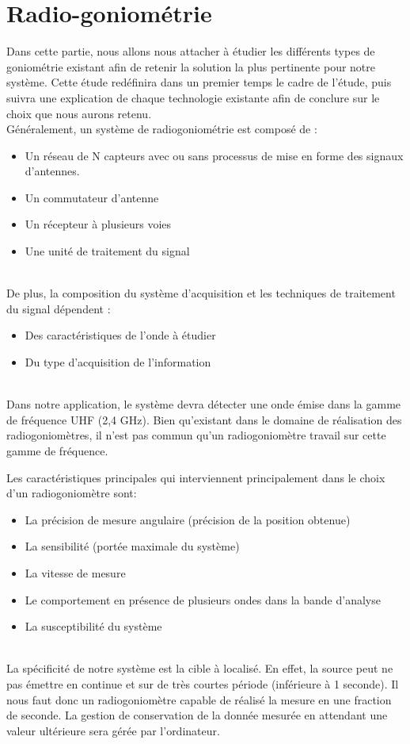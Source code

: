 \chapter{Radio-goniométrie}



Dans cette partie, nous allons nous attacher à étudier les différents types de goniométrie existant afin de retenir la solution la plus pertinente pour notre système. Cette étude redéfinira dans un premier temps le cadre de l’étude, puis suivra une explication de chaque technologie existante afin de conclure sur le choix que nous aurons retenu.
~\\

Généralement, un système de radiogoniométrie est composé de  :

\begin{itemize}
\item Un réseau de N capteurs avec ou sans processus de mise en forme des signaux d’antennes.

\item Un commutateur d’antenne
\item Un récepteur à plusieurs voies
\item Une unité de traitement du signal

\end{itemize}
~\\
De plus, la composition du système d’acquisition et les techniques de traitement du signal dépendent :
\begin{itemize}
\item  Des caractéristiques de l’onde à étudier
\item  Du type d’acquisition de l’information
\end{itemize}
~\\
Dans notre application, le système devra détecter une onde émise dans la gamme de fréquence UHF (2,4 GHz). Bien qu’existant dans le domaine de réalisation des radiogoniomètres, il n’est pas commun qu’un radiogoniomètre travail sur cette gamme de fréquence.

Les caractéristiques principales qui interviennent principalement dans le choix d’un radiogoniomètre sont:

\begin{itemize}
\item La précision de mesure angulaire (précision de la position obtenue)
\item La sensibilité (portée maximale du système) 
\item La vitesse de mesure
\item Le comportement en présence de plusieurs ondes dans la bande d’analyse
\item La susceptibilité du système
\end{itemize}
~\\
La spécificité de notre système est la cible à localisé. En effet, la source peut ne pas émettre en  continue et sur de très courtes période (inférieure à 1 seconde). Il nous faut donc un radiogoniomètre capable de réalisé la mesure en une fraction de seconde. La gestion de conservation de la donnée mesurée en attendant une valeur ultérieure sera gérée par l’ordinateur.


